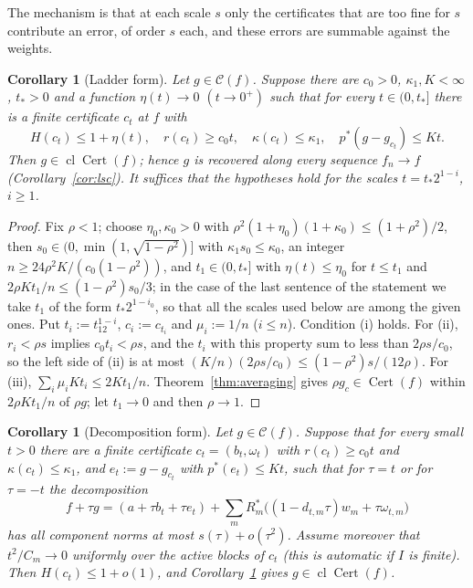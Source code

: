 \documentclass[10pt]{amsart}
\newtheorem{corollary}[theorem]{Corollary}
\theoremstyle{definition}
\theoremstyle{remark}
\newcommand{\Cset}{\mathcal C}
\newcommand{\Cert}{\operatorname{Cert}}
\newcommand{\cl}{\operatorname{cl}}
\begin{document}
The mechanism is that at each scale $s$ only the certificates that are too
fine for $s$ contribute an error, of order $s$ each, and these errors are
summable against the weights.

\begin{corollary}[Ladder form]\label{cor:ladder}
Let $g\in\Cset(f)$.  Suppose there are $c_0>0$, $\kappa_1,K<\infty$, $t_*>0$
and a function $\eta(t)\to0$ $(t\to0^+)$ such that for every $t\in(0,t_*]$
there is a finite certificate $c_t$ at $f$ with
\[
 H(c_t)\le1+\eta(t),\quad r(c_t)\ge c_0t,\quad \kappa(c_t)\le\kappa_1,\quad
 p^*(g-g_{c_t})\le Kt.
\]
Then $g\in\cl\Cert(f)$; hence $g$ is recovered along every sequence
$f_n\to f$ \textup{(}Corollary~\ref{cor:lsc}\textup{)}.  It suffices that
the hypotheses hold for the scales $t=t_*2^{1-i}$, $i\ge1$.
\end{corollary}

\begin{proof}
Fix $\rho<1$; choose $\eta_0,\kappa_0>0$ with
$\rho^2(1+\eta_0)(1+\kappa_0)\le(1+\rho^2)/2$, then
$s_0\in(0,\min(1,\sqrt{1-\rho^2})]$ with $\kappa_1s_0\le\kappa_0$, an integer
$n\ge24\rho^2K/(c_0(1-\rho^2))$, and $t_1\in(0,t_*]$ with $\eta(t)\le\eta_0$
for $t\le t_1$ and $2\rho Kt_1/n\le(1-\rho^2)s_0/3$; in the case of the last
sentence of the statement we take $t_1$ of the form $t_*2^{1-i_0}$, so that
all the scales used below are among the given ones.  Put $t_i:=t_12^{1-i}$,
$c_i:=c_{t_i}$ and $\mu_i:=1/n$ ($i\le n$).  Condition (i) holds.  For (ii),
$r_i<\rho s$ implies $c_0t_i<\rho s$, and the $t_i$ with this property sum
to less than $2\rho s/c_0$, so the left side of (ii) is at most
$(K/n)(2\rho s/c_0)\le(1-\rho^2)s/(12\rho)$.  For (iii),
$\sum_i\mu_iKt_i\le2Kt_1/n$.  Theorem~\ref{thm:averaging} gives $\rho
g_{c}\in\Cert(f)$ within $2\rho Kt_1/n$ of $\rho g$; let $t_1\to0$ and then
$\rho\to1$.
\end{proof}

\begin{corollary}[Decomposition form]\label{cor:decomposition}
Let $g\in\Cset(f)$.  Suppose that for every small $t>0$ there are a finite
certificate $c_t=(b_t,\omega_t)$ with $r(c_t)\ge c_0t$ and
$\kappa(c_t)\le\kappa_1$, and $e_t:=g-g_{c_t}$ with $p^*(e_t)\le Kt$, such
that for $\tau=t$ or for $\tau=-t$ the decomposition
\[
 f+\tau g=(a+\tau b_t+\tau e_t)+\sum_mR_m^*\big((1-d_{t,m}\tau)w_m+\tau
 \omega_{t,m}\big)
\]
has all component norms at most $s(\tau)+o(\tau^2)$.  Assume moreover that
$t^2/C_m\to0$ uniformly over the active blocks of $c_t$ \textup{(}this is
automatic if $I$ is finite\textup{)}.  Then $H(c_t)\le1+o(1)$, and
Corollary~\ref{cor:ladder} gives $g\in\cl\Cert(f)$.
\end{corollary}
\end{document}
